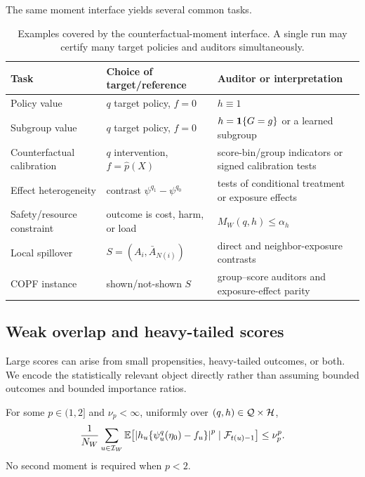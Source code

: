 The same moment interface yields several common tasks.
\begin{table}[t]
\centering
\small
\setlength{\tabcolsep}{4pt}
\begin{tabularx}{\linewidth}{@{}p{.22\linewidth}p{.25\linewidth}X@{}}
\toprule
Task & Choice of target/reference & Auditor or interpretation \\
\midrule
Policy value & $q$ target policy, $f=0$ & $h\equiv1$ \\
Subgroup value & $q$ target policy, $f=0$ & $h=\mathbf{1}\{G=g\}$ or a learned subgroup \\
Counterfactual calibration & $q$ intervention, $f=\widehat p(X)$ & score-bin/group indicators or signed calibration tests \\
Effect heterogeneity & contrast $\psi^{q_1}-\psi^{q_0}$ & tests of conditional treatment or exposure effects \\
Safety/resource constraint & outcome is cost, harm, or load & $M_W(q,h)\le\alpha_h$ \\
Local spillover & $S=(A_i,\bar A_{N(i)})$ & direct and neighbor-exposure contrasts \\
COPF instance & shown/not-shown $S$ & group--score auditors and exposure-effect parity \\
\bottomrule
\end{tabularx}
\caption{Examples covered by the counterfactual-moment interface. A single run may certify many target policies and auditors simultaneously.}
\label{tab:moment-examples}
\end{table}

\subsection{Weak overlap and heavy-tailed scores}
Large scores can arise from small propensities, heavy-tailed outcomes, or both. We encode the statistically relevant object directly rather than assuming bounded outcomes and bounded importance ratios.

\begin{assumption}
\label{ass:p-moment}
For some $p\in(1,2]$ and $\nu_p<\infty$, uniformly over $(q,h)\in\mathcal{Q}\times\mathcal{H}$,
\begin{equation}
\frac{1}{N_W}\sum_{u\in\mathcal{I}_W}
\mathbb{E}\!\left[
\left|h_u\{\psi_u^q(\eta_0)-f_u\}\right|^p
\mid\mathcal{F}_{t(u)-1}
\right]
\le \nu_p^p.
\label{eq:p-moment}
\end{equation}
No second moment is required when $p<2$.
\end{assumption}

